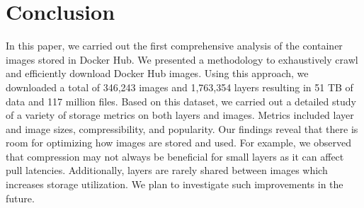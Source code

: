 \section{Conclusion}
\label{sec:conclusion}

In this paper, we carried out the first comprehensive analysis of the container images
stored in Docker Hub.
%
We presented a methodology to exhaustively crawl and efficiently download Docker Hub
images. Using this approach, we downloaded a total of 346,243 images and 1,763,354 layers
resulting in 51 TB of data and
117 million files.
%
Based on this dataset, we carried out a detailed study of a variety of storage
metrics on both layers and images. Metrics included layer and image sizes, compressibility,
and popularity. Our findings reveal that there is room for optimizing how images
are stored and used. For example, we observed that compression may not always be beneficial for small
layers as it can affect pull latencies. Additionally, layers are rarely shared between
images which increases storage utilization. We plan to investigate such improvements
in the future.

%
%
